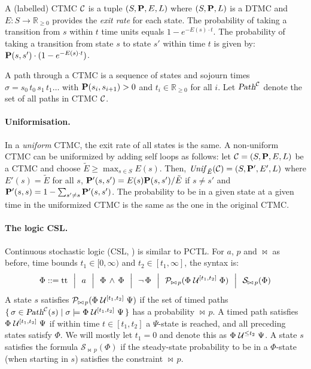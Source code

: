 \documentclass{llncs}
\begin{document}
        A (labelled) CTMC $\mathcal{C}$ is a tuple $(S,\mathbf{P},E,L)$
        where $(S,\mathbf{P},L)$ is a DTMC
        and $E: S \to \mathbb{R}_{\geq 0}$ provides the \emph{exit rate} for each state.
        The probability of taking a transition from $s$ within $t$ time units 
        equals $1-e^{{-}E(s) \cdot t}$.
        The probability of taking a transition from state $s$ to state $s'$
        within time $t$ is given by: $\mathbf{P}(s,s') \cdot(1-e^{{-}E(s) \cdot t})$.

	A path through a CTMC is a sequence of states and sojourn times
	$\sigma = s_0 \, t_0 \, s_1 \, t_1 \ldots$
	with $\mathbf{P}(s_i,s_{i+1})>0$ and $t_i \in \mathbb{R}_{\geq 0}$ for all $i$.
	Let $\mbox{\sl Path}^{\mathcal{C}}$ denote the set of all paths in CTMC $\mathcal{C}$.

\paragraph{Uniformisation.}
        In a \emph{uniform} CTMC, the exit rate of all states is the same.
        A non-uniform CTMC can be uniformized by adding self loops as follows:
        let $\mathcal{C} = (S,\mathbf{P},E,L)$ be a CTMC
        and choose $\tilde{E} \geq \max_{s \in S} E(s)$.
        Then, $\mathit{Unif}_{\tilde{E}}(\mathcal{C}) = (S,\mathbf{P}',E',L)$
        where $E'(s) = \tilde{E}$ for all $s$,
        $\mathbf{P}'(s,s') = E(s) \mathbf{P}(s,s') / \tilde{E}$ if $s \not= s'$
        and $\mathbf{P}'(s,s) = 1 - \sum_{s' \not= s} \mathbf{P}'(s,s')$.
        The probability to be in a given state at a given time in the uniformized CTMC
	is the same as the one in the original CTMC.

\paragraph{The logic CSL.}

        Continuous stochastic logic (CSL, \cite{BaierHHK_TSE03}) is similar to PCTL.
        For $a$, $p$ and $\bowtie$ as before, time bounds $t_1 \in [0, \infty)$ and $t_2 \in [t_1, \infty]$,
        the syntax is:
        \[ \Phi ::= \true \ \ \Big|  \ \ a \ \ \Big| 
              \ \ \Phi \, \wedge \, \Phi  \ \ \Big| 
              \ \ \neg \, \Phi \ \ \Big| 
              \ \ \mathcal{P}_{\bowtie \, p}(\Phi \rU{[t_1, t_2]} \Phi)
                \ \ \Big|
                \ \ \mathcal{S}_{\bowtie \, p}(\Phi)
        \]
        A state $s$ satisfies $\mathcal{P}_{\bowtie \, p}(\Phi \mathrel{\mathcal{U}^{[t_1, t_2]}} \Psi)$
        if the set of timed paths $\{ \,  \sigma \in \mbox{\sl Path}^{\mathcal{C}}(s) \mid \sigma \models \Phi \mathrel{\mathcal{U}^{[t_1, t_2]}} \Psi  \, \}$
        has a probability $\bowtie \, p$.
        A timed path
        satisfies $\Phi \mathrel{\mathcal{U}^{[t_1, t_2]}} \Psi$
        if within time $t \in [t_1, t_2]$ a $\Psi$-state is reached,
        and all preceding states satisfy $\Phi$.
        We will mostly let $t_1=0$
        and denote this as $\Phi \mathrel{\mathcal{U}^{\leq t_2}} \Psi$.
        A state $s$ satisfies the formula $\mathcal{S}_{\bowtie \, p}(\Phi)$
        if the steady-state probability
        to be in a $\Phi$-state (when starting in $s$)
        satisfies the constraint $\bowtie \, p$.
\end{document}
